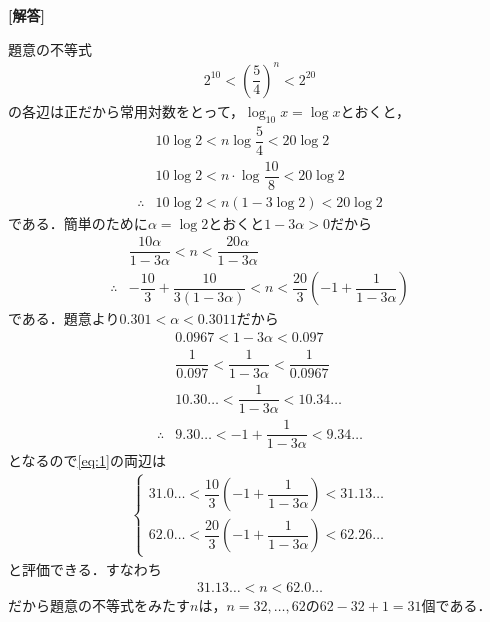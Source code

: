 \documentclass[../../main.tex]{subfiles}
\begin{document}
\begin{oframed}
  
\end{oframed}

{\bf [解答]}

題意の不等式
\begin{align}
  2^{10}<\left(\dfrac{5}{4}\right)^n<2^{20}
\end{align}
の各辺は正だから常用対数をとって，$\log_{10}x=\log x$とおくと，
\begin{align}
  & 10\log2<n\log\dfrac{5}{4}<20\log2 \\
  & 10\log2<n\cdot\log\dfrac{10}{8}<20\log2 \\
  \therefore
  & 10\log2<n(1-3\log2)<20\log2
\end{align}
である．簡単のために$\alpha=\log2$とおくと$1-3\alpha>0$だから
\begin{align}
  & \dfrac{10\alpha}{1-3\alpha}<n<\dfrac{20\alpha}{1-3\alpha} \\
  \therefore
  & -\dfrac{10}{3}+\dfrac{10}{3(1-3\alpha)}<n<\dfrac{20}{3}\left(-1+\dfrac{1}{1-3\alpha}\right) \label{eq:1}
\end{align}
である．題意より$0.301<\alpha<0.3011$だから
\begin{align}
  & 0.0967<1-3\alpha<0.097 \\
  & \dfrac{1}{0.097}<\dfrac{1}{1-3\alpha}<\dfrac{1}{0.0967} \\
  & 10.30\ldots<\dfrac{1}{1-3\alpha}<10.34\ldots \\
  \therefore
  & 9.30\ldots<-1+\dfrac{1}{1-3\alpha}<9.34\ldots
\end{align}
となるので\cref{eq:1}の両辺は
\begin{align}
  \begin{cases}
    31.0\ldots<\dfrac{10}{3}\left(-1+\dfrac{1}{1-3\alpha}\right)<31.13\ldots \\
    62.0\ldots<\dfrac{20}{3}\left(-1+\dfrac{1}{1-3\alpha}\right)<62.26\ldots
  \end{cases}
\end{align}
と評価できる．すなわち
\begin{align}
  31.13\ldots < n < 62.0\ldots
\end{align}
だから題意の不等式をみたす$n$は，$n=32,\ldots,62$の$62-32+1=31$個である．

\newpage
\end{document}
